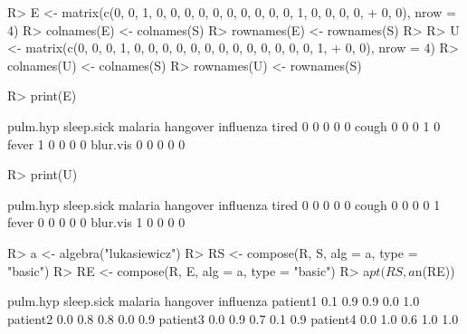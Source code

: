 \documentclass{article}\usepackage[]{graphicx}\usepackage[]{color}
\begin{document}
\begin{Schunk}
\begin{Sinput}
R> E <- matrix(c(0, 0, 1, 0, 0, 0, 0, 0, 0, 0, 0, 0, 0, 1, 0, 0, 0, 0, 
+      0, 0), nrow = 4)
R> colnames(E) <- colnames(S)
R> rownames(E) <- rownames(S)
R> 
R> U <- matrix(c(0, 0, 0, 1, 0, 0, 0, 0, 0, 0, 0, 0, 0, 0, 0, 0, 0, 1, 
+      0, 0), nrow = 4)
R> colnames(U) <- colnames(S)
R> rownames(U) <- rownames(S)
\end{Sinput}
\end{Schunk}

\begin{Schunk}
% --begin: "comp.e"
\begin{Sinput}
R> print(E)
\end{Sinput}
\begin{Soutput}
         pulm.hyp sleep.sick malaria hangover influenza
tired           0          0       0        0         0
cough           0          0       0        1         0
fever           1          0       0        0         0
blur.vis        0          0       0        0         0
\end{Soutput}
%
% --end: "comp.e"
\end{Schunk}

\begin{Schunk}
% --begin: "comp.u"
\begin{Sinput}
R> print(U)
\end{Sinput}
\begin{Soutput}
         pulm.hyp sleep.sick malaria hangover influenza
tired           0          0       0        0         0
cough           0          0       0        0         1
fever           0          0       0        0         0
blur.vis        1          0       0        0         0
\end{Soutput}
%
% --end: "comp.u"
\end{Schunk}

\begin{Schunk}
% --begin: "comp.circ.excl"
\begin{Sinput}
R> a <- algebra("lukasiewicz")
R> RS <- compose(R, S, alg = a, type = "basic")
R> RE <- compose(R, E, alg = a, type = "basic")
R> a$pt(RS, a$n(RE))
\end{Sinput}
\begin{Soutput}
         pulm.hyp sleep.sick malaria hangover influenza
patient1      0.1        0.9     0.9      0.0       1.0
patient2      0.0        0.8     0.8      0.0       0.9
patient3      0.0        0.9     0.7      0.1       0.9
patient4      0.0        1.0     0.6      1.0       1.0
\end{Soutput}
%
% --end: "comp.circ.excl"
\end{Schunk}
\end{document}
